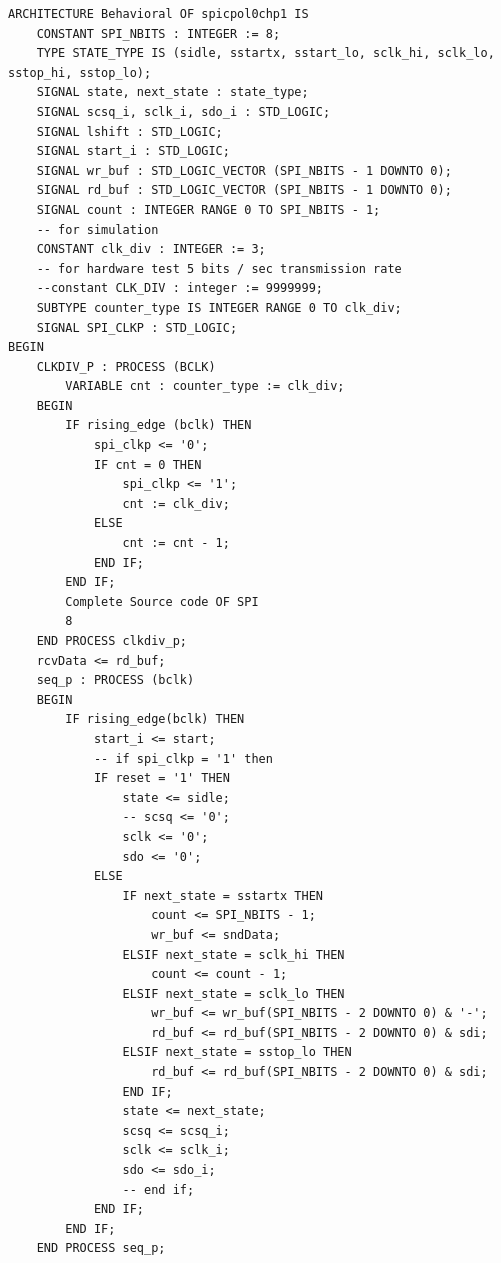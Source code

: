 \begin{verbatim}
ARCHITECTURE Behavioral OF spicpol0chp1 IS
    CONSTANT SPI_NBITS : INTEGER := 8;
    TYPE STATE_TYPE IS (sidle, sstartx, sstart_lo, sclk_hi, sclk_lo, sstop_hi, sstop_lo);
    SIGNAL state, next_state : state_type;
    SIGNAL scsq_i, sclk_i, sdo_i : STD_LOGIC;
    SIGNAL lshift : STD_LOGIC;
    SIGNAL start_i : STD_LOGIC;
    SIGNAL wr_buf : STD_LOGIC_VECTOR (SPI_NBITS - 1 DOWNTO 0);
    SIGNAL rd_buf : STD_LOGIC_VECTOR (SPI_NBITS - 1 DOWNTO 0);
    SIGNAL count : INTEGER RANGE 0 TO SPI_NBITS - 1;
    -- for simulation
    CONSTANT clk_div : INTEGER := 3;
    -- for hardware test 5 bits / sec transmission rate
    --constant CLK_DIV : integer := 9999999;
    SUBTYPE counter_type IS INTEGER RANGE 0 TO clk_div;
    SIGNAL SPI_CLKP : STD_LOGIC;
BEGIN
    CLKDIV_P : PROCESS (BCLK)
        VARIABLE cnt : counter_type := clk_div;
    BEGIN
        IF rising_edge (bclk) THEN
            spi_clkp <= '0';
            IF cnt = 0 THEN
                spi_clkp <= '1';
                cnt := clk_div;
            ELSE
                cnt := cnt - 1;
            END IF;
        END IF;
        Complete Source code OF SPI
        8
    END PROCESS clkdiv_p;
    rcvData <= rd_buf;
    seq_p : PROCESS (bclk)
    BEGIN
        IF rising_edge(bclk) THEN
            start_i <= start;
            -- if spi_clkp = '1' then
            IF reset = '1' THEN
                state <= sidle;
                -- scsq <= '0';
                sclk <= '0';
                sdo <= '0';
            ELSE
                IF next_state = sstartx THEN
                    count <= SPI_NBITS - 1;
                    wr_buf <= sndData;
                ELSIF next_state = sclk_hi THEN
                    count <= count - 1;
                ELSIF next_state = sclk_lo THEN
                    wr_buf <= wr_buf(SPI_NBITS - 2 DOWNTO 0) & '-';
                    rd_buf <= rd_buf(SPI_NBITS - 2 DOWNTO 0) & sdi;
                ELSIF next_state = sstop_lo THEN
                    rd_buf <= rd_buf(SPI_NBITS - 2 DOWNTO 0) & sdi;
                END IF;
                state <= next_state;
                scsq <= scsq_i;
                sclk <= sclk_i;
                sdo <= sdo_i;
                -- end if;
            END IF;
        END IF;
    END PROCESS seq_p;


\end{verbatim}
